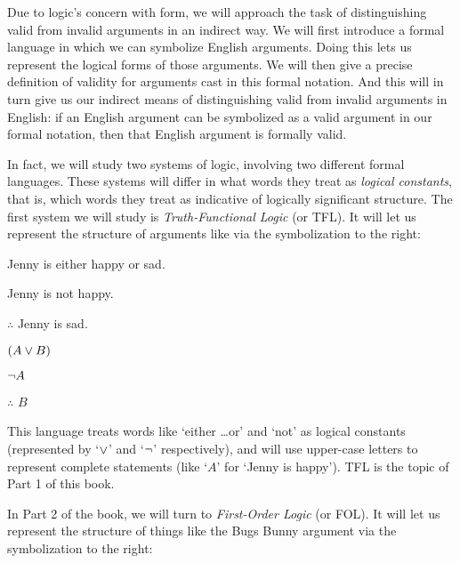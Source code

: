 Due to logic's concern with form, we will approach the task of distinguishing valid from invalid arguments in an indirect way. We will first introduce a formal language in which we can symbolize English arguments.  Doing this lets us represent the logical forms of those arguments.  We will then give a precise definition of validity for arguments cast in this formal notation.  And this will in turn give us our indirect means of distinguishing valid from invalid arguments in English: if an English argument can be symbolized as a valid argument in our formal notation, then that English argument is formally valid.

In fact, we will study two systems of logic, involving two different formal languages. These systems will differ in what words they treat as \emph{logical constants}, that is,  which words they treat as indicative of logically significant structure.  The first system we will study is \emph{Truth-Functional Logic} (or TFL).  It will let us represent the structure of arguments like  via the symbolization to the right:

\begin{multicols}{2}

	\begin{earg}
		\item[\eref{exarg8}] Jenny is either happy or sad.
		\item[] Jenny is not happy.
		\item[] $\therefore$ Jenny is sad.
	\end{earg}

\columnbreak

	\begin{earg}
		\item[] $(A \vee B)$
		\item[] $\neg A$
		\item[] $\therefore$ $B$
	\end{earg}

\end{multicols}

\noindent This language treats words like `either \ldots or' and `not' as logical constants (represented by `$\vee$' and `$\neg$' respectively), and will use upper-case letters to represent complete statements (like `$A$' for `Jenny is happy').  TFL is the topic of Part 1 of this book.

In Part 2 of the book, we will turn to \emph{First-Order Logic} (or FOL).  It will let us represent the structure of things like the Bugs Bunny argument via the symbolization to the right:


